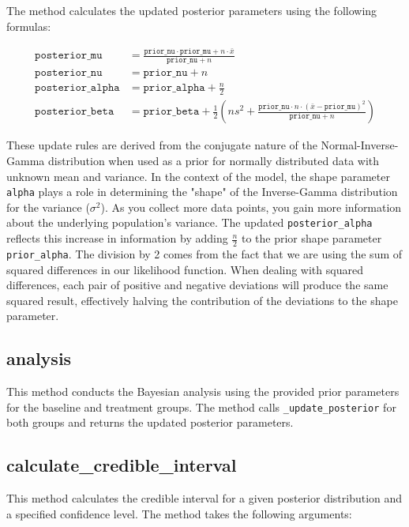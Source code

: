 \documentclass{article}
\begin{document}
The method calculates the updated posterior parameters using the following formulas:

\begin{align*}
    \texttt{posterior\_mu} &= \frac{\texttt{prior\_nu} \cdot \texttt{prior\_mu} + n \cdot \bar{x}}{\texttt{prior\_nu} + n} \\
    \texttt{posterior\_nu} &= \texttt{prior\_nu} + n \\
    \texttt{posterior\_alpha} &= \texttt{prior\_alpha} + \frac{n}{2} \\
    \texttt{posterior\_beta} &= \texttt{prior\_beta} + \frac{1}{2}\left(ns^2 + \frac{\texttt{prior\_nu} \cdot n \cdot (\bar{x} - \texttt{prior\_mu})^2}{\texttt{prior\_nu} + n}\right)
\end{align*}

These update rules are derived from the conjugate nature of the Normal-Inverse-Gamma distribution when used as a prior for normally distributed data with unknown mean and variance. In the context of the model, the shape parameter \texttt{alpha} plays a role in determining the "shape" of the Inverse-Gamma distribution for the variance ($\sigma^2$). As you collect more data points, you gain more information about the underlying population's variance. The updated \texttt{posterior\_alpha} reflects this increase in information by adding $\frac{n}{2}$ to the prior shape parameter \texttt{prior\_alpha}. The division by 2 comes from the fact that we are using the sum of squared differences in our likelihood function. When dealing with squared differences, each pair of positive and negative deviations will produce the same squared result, effectively halving the contribution of the deviations to the shape parameter.


\subsection{analysis}

This method conducts the Bayesian analysis using the provided prior parameters for the baseline and treatment groups. The method calls \texttt{\_update\_posterior} for both groups and returns the updated posterior parameters.

\subsection{calculate\_credible\_interval}

This method calculates the credible interval for a given posterior distribution and a specified confidence level. The method takes the following arguments:
\end{document}
